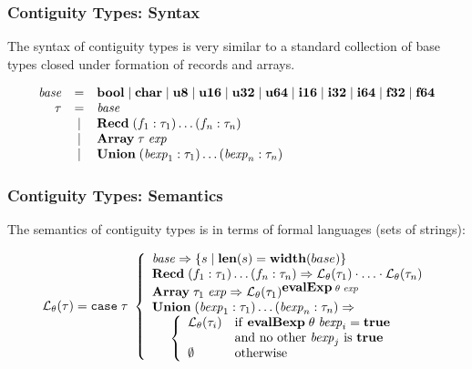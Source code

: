 \documentclass{beamer}
\newcommand{\konst}[1]{\ensuremath{\mbox{\bf{#1}}}}
\newcommand{\set}[1]{\{ {#1} \}}
\newcommand{\LangTheta}[1]{\ensuremath{{\mathcal L}_{\theta}({#1})}}
\begin{document}
\begin{frame}[fragile]\frametitle{Contiguity Types: Syntax}

The syntax of contiguity types is very similar to a standard
collection of base types closed under formation of records and arrays.

\[
\begin{array}{rcl}
 \mathit{base} & = & \konst{bool} \mid \konst{char} \mid \konst{u8} \mid
 \konst{u16} \mid \konst{u32} \mid \konst{u64}  \mid \konst{i16} \mid
 \konst{i32} \mid \konst{i64} \mid \konst{f32} \mid \konst{f64} \\
 \tau & = & \mathit{base} \\
      & \mid & \konst{Recd}\; (f_1 : \tau_1) \ldots (f_n : \tau_n) \\
      & \mid & \konst{Array}\; \tau \; \mathit{exp} \\
      & \mid & \konst{Union}\; (\mathit{bexp}_1 : \tau_1) \ldots (\mathit{bexp}_n : \tau_n)
\end{array}
\]
\end{frame}


\begin{frame}[fragile]\frametitle{Contiguity Types: Semantics}

The semantics of contiguity types is in terms of formal languages
(sets of strings):

\[
\LangTheta{\tau} =
\mathtt{case}\; \tau\
 \left\{
 \begin{array}{l}
 \mathit{base} \Rightarrow \set{s \mid \konst{len}(s) = \konst{width}(base)} \\
 \konst{Recd}\; (f_1 : \tau_1) \ldots (f_n : \tau_n)
      \Rightarrow \LangTheta{\tau_1} \cdot \ldots \cdot \LangTheta{\tau_n}
\\
 \konst{Array}\; \tau_1 \; \mathit{exp}
      \Rightarrow  \LangTheta{\tau_1}^{\konst{evalExp}\;\theta\;\mathit{exp}}
\\
 \konst{Union}\; (\mathit{bexp}_1 : \tau_1) \ldots (\mathit{bexp}_n : \tau_n) \Rightarrow \\
  \hspace*{5mm}
 \left\{
 \begin{array}{ll}
    \LangTheta{\tau_i} &  \mathrm{if}\ \konst{evalBexp}\;\theta\;\mathit{bexp}_i = \konst{true} \\
                  & \mathrm{and\ no\ other}\ \mathit{bexp}_j\ \mathrm{is}\ \konst{true}  \\
    \emptyset & \mathrm{otherwise}
 \end{array}
 \right.
 \\
\end{array}
 \right.
\]
\end{frame}
\end{document}
